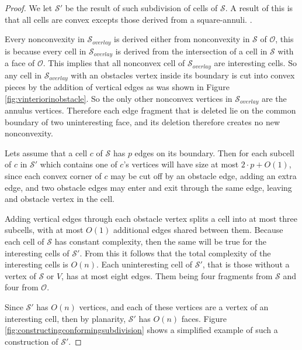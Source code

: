 \begin{proof}
We let $\mathcal{S}'$ be the result of such subdivision of cells of $\mathcal{S}$. A 
result of this is that all cells are convex excepts those derived from a square-annuli. 
. 

Every nonconvexity in $\mathcal{S}_{overlay}$ is derived either from nonconvexity in 
$\mathcal{S}$ of $\mathcal{O}$, this is because every cell in $\mathcal{S}_{overlay}$ is 
derived from the intersection of a cell in $\mathcal{S}$ with a face of $\mathcal{O}$. 
This implies that all nonconvex cell of $\mathcal{S}_{overlay}$ are interesting cells. So 
any cell in $\mathcal{S}_{overlay}$ with an obstacles vertex inside its boundary is cut 
into convex pieces by the addition of vertical edges as was shown in Figure 
\ref{fig:vinteriorinobstacle}. So the only other nonconvex vertices in 
$\mathcal{S}_{overlay}$ are the annulus vertices. Therefore each edge fragment that is 
deleted lie on the common boundary of two uninteresting face, and its deletion therefore 
creates no new nonconvexity. 

Lets assume that a cell $c$ of $\mathcal{S}$ has $p$ edges on its boundary. Then for each 
subcell of $c$ in $\mathcal{S}'$ which contains one of $c$'s vertices will have size at most 
$2\cdot p + O(1)$, since each convex corner of $c$ may be cut off by an obstacle edge, adding 
an extra edge, and two obstacle edges may enter and exit through the same edge, leaving and 
obstacle vertex in the cell. 

Adding vertical edges through each obstacle vertex splits a cell into at most three subcells, 
with at most $O(1)$ additional edges shared between them. Because each cell of $\mathcal{S}$ 
has constant complexity, then the same will be true for the interesting cells of 
$\mathcal{S}'$. From this it follows that the total complexity of the interesting cells is 
$O(n)$. Each uninteresting cell of $\mathcal{S}'$, that is those without a vertex of 
$\mathcal{S}$ or $V$, has at most eight edges. Them being four fragments from 
$\mathcal{S}$ and four from $\mathcal{O}$. 

Since $\mathcal{S}'$ has $O(n)$ vertices, and each of these vertices are a vertex of an 
interesting cell, then by planarity, $\mathcal{S}'$ has $O(n)$ faces. Figure 
\ref{fig:constructingconformingsubdivision} shows a simplified example of such a construction 
of $\mathcal{S}'$. 



\end{proof}
